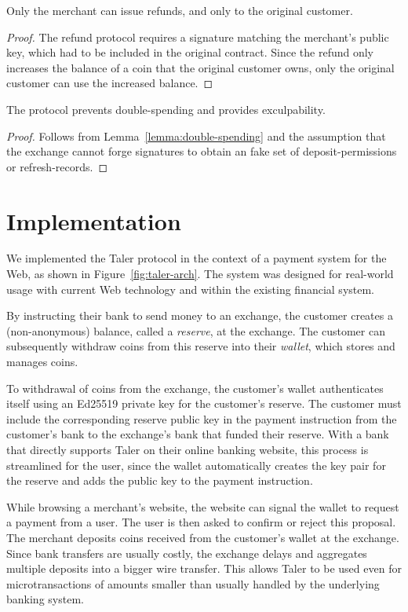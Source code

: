 \documentclass[sigconf, authordraft]{acmart}
\begin{document}
\begin{lemma}
Only the merchant can issue refunds, and only to the original customer.
\end{lemma}

\begin{proof}
The refund protocol requires a signature matching the merchant's public
key, which had to be included in the original contract.
Since the refund only increases the balance of a coin that the original
customer owns, only the original customer can use the increased balance.
\end{proof}


\begin{theorem}
  The protocol prevents double-spending and provides exculpability.
\end{theorem}
\begin{proof}
  Follows from Lemma~\ref{lemma:double-spending} and the assumption
  that the exchange cannot forge signatures to obtain an fake
  set of deposit-permissions or refresh-records.
\end{proof}



\section{Implementation}

We implemented the Taler protocol in the context of a payment system
for the Web, as shown in Figure~\ref{fig:taler-arch}.  The system was
designed for real-world usage with current Web technology and within
the existing financial system.

By instructing their bank to send money to an exchange, the customer
creates a (non-anonymous) balance, called a \emph{reserve}, at the
exchange.  The customer can subsequently withdraw coins from this
reserve into their \emph{wallet}, which stores and manages coins.

To withdrawal of coins from the exchange, the customer's wallet authenticates
itself using an Ed25519 private key for the customer's reserve.
The customer must include the corresponding reserve public key in the
payment instruction from the customer's bank to the exchange's bank
that funded their reserve.  With a bank that directly supports Taler
on their online banking website, this process is streamlined for the
user, since the wallet automatically creates the key pair for the
reserve and adds the public key to the payment instruction.

While browsing a merchant's website, the website can signal the wallet
to request a payment from a user.  The user is then asked to confirm
or reject this proposal.  The merchant deposits coins received from
the customer's wallet at the exchange.  Since bank transfers are
usually costly, the exchange delays and aggregates multiple deposits
into a bigger wire transfer.  This allows Taler to be used even for
microtransactions of amounts smaller than usually handled by the
underlying banking system.
\end{document}
